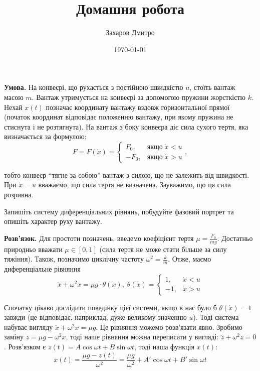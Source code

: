 \documentclass[oneside,solution]{tmpl}
\title{Домашня робота}
\author{Захаров Дмитро}
\date{\today}
\begin{document}
\maketitle



\hspace{20px}\textbf{Умова.} На конвеєрі, що рухається з постійною швидкістю $u$, стоїть вантаж масою $m$. Вантаж утримується на конвеєрі за допомогою пружини жорсткістю $k$. Нехай $x(t)$ позначає координату вантажу вздовж горизонтальної прямої (початок координат відповідає положенню вантажу, при якому пружина не стиснута і не розтягнута). На вантаж з боку конвеєра діє сила сухого тертя, яка визначається за формулою:
\begin{equation}
    F = F(\dot{x}) = \begin{cases}
        F_0, & \text{якщо} \; \dot{x} < u \\
        -F_0, & \text{якщо} \; \dot{x} > u 
    \end{cases},
\end{equation}

тобто конвеєр ``тягне за собою'' вантаж з силою, що не залежить від швидкості. При $\dot{x}=u$ вважаємо, що сила тертя не визначена. Зауважимо, що ця сила розривна.

Запишіть систему диференціальних рівнянь, побудуйте фазовий портрет та опишіть характер руху вантажу.

\textbf{Розв'язок.} Для простоти позначень, введемо коефіцієнт тертя $\mu=\frac{F_0}{mg}$. Достатньо природньо вважати $\mu \in [0,1]$ (сила тертя не може стати більше за силу тяжіння). Також, позначимо циклічну частоту $\omega^2 = \frac{k}{m}$. Отже, маємо диференціальне рівняння
\begin{equation}
    \ddot{x} +  \omega^2 x = \mu g \cdot \theta(\dot{x}), \; \theta(\dot{x}) = \begin{cases}
        1, & \dot{x} < u \\
        -1, & \dot{x} > u
\end{cases}
\end{equation}

Спочатку цікаво дослідити поведінку цієї системи, якщо в нас було б $\theta(\dot{x})=1$ завжди (це відповідає, наприклад, дуже великому значенню $u$). Тоді система набуває вигляду $\ddot{x} + \omega^2 x = \mu g$. Це рівняння можемо розв'язати явно. Зробимо заміну $z=\mu g - \omega^2 x$, тоді наше рівняння можна переписати у вигляді: $\ddot{z} + \omega^2 z = 0$. Розв'язком є $z(t) = A \cos \omega t + B \sin \omega t$, тоді наша функція $x(t)$:
\begin{equation}
    x(t) = \frac{\mu g - z(t)}{\omega^2} = \frac{\mu g}{\omega^2} + A' \cos \omega t + B' \sin \omega t
\end{equation}
\end{document}
